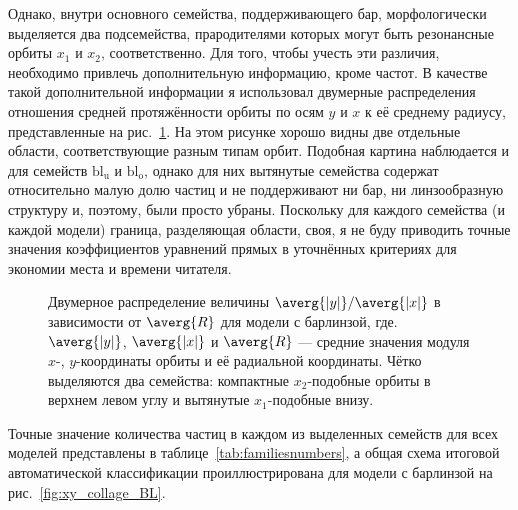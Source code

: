 \documentclass[tikz]{trlnotes}
\begin{document}
Однако, внутри основного семейства, поддерживающего бар, морфологически выделяется два подсемейства,
прародителями которых могут быть резонансные орбиты $x_1$ и $x_2$, соответственно. Для того, чтобы учесть
эти различия, необходимо привлечь дополнительную информацию, кроме частот.
В качестве такой дополнительной информации я использовал двумерные распределения отношения средней протяжённости
орбиты по осям $y$ и $x$ к её среднему радиусу, представленные на рис.~\ref{fig:x1x2sep}. На этом рисунке хорошо видны две отдельные области, соответствующие разным типам орбит. Подобная картина наблюдается и для семейств
$\text{bl}_\text{u}$ и $\text{bl}_\text{o}$, однако для них вытянутые семейства содержат относительно малую долю частиц и не поддерживают ни бар, ни линзообразную структуру и, поэтому, были просто убраны. 
Поскольку для каждого семейства (и каждой модели) граница, разделяющая области, своя, я не буду приводить точные значения коэффициентов уравнений прямых в
уточнённых критериях для экономии места и времени читателя.  

\begin{figure}[htpb]
  \centering
\caption{Двумерное распределение величины $\averg{|y|}/\averg{|x|}$ в зависимости от $\averg{R}$ для модели с барлинзой, где. $\averg{|y|}$, $\averg{|x|}$ и  $\averg{R}$ --- средние значения модуля $x$-, $y$-координаты орбиты и её радиальной координаты. Чётко выделяются
два семейства: компактные $x_2$-подобные орбиты в верхнем левом углу и вытянутые $x_1$-подобные внизу.}%
\label{fig:x1x2sep}
\end{figure}

Точные значение количества частиц в каждом из выделенных семейств для всех моделей представлены в таблице~\ref{tab:familiesnumbers},
а общая схема итоговой автоматической классификации проиллюстрирована для модели с барлинзой на рис.~\ref{fig:xy_collage_BL}.
\end{document}
